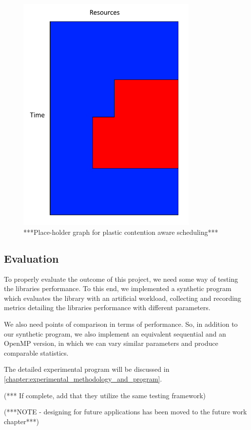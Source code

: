 \begin{figure}
	\includegraphics[width=0.8\textwidth]{graphics/placeholder_plastic_contention_aware_scheduling.png}
	\caption{***Place-holder graph for plastic contention aware scheduling***}
	\label{fig:plastic_contention_aware_scheduling}
\end{figure}



\subsection{Evaluation}

To properly evaluate the outcome of this project, we need some way of testing the libraries performance. To this end, we implemented a synthetic program which evaluates the library with an artificial workload, collecting and recording metrics detailing the libraries performance with different parameters.  

We also need points of comparison in terms of performance. So, in addition to our synthetic program, we also implement an equivalent sequential and an OpenMP version, in which we can vary similar parameters and produce comparable statistics. 

The detailed experimental program will be discussed in \ref{chapter:experimental_methodology_and_program}.

(*** If complete, add that they utilize the same testing framework)

(***NOTE - designing for future applications has been moved to the future work chapter***)